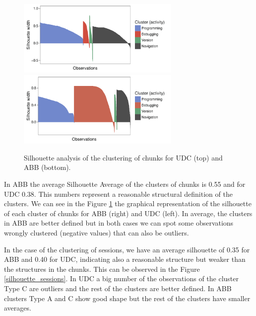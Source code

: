 \begin{figure}[!ht]
	
	\centering		
	\includegraphics[width=0.7\textwidth]{Figures/UDC_silhouette_chunks}
	\includegraphics[width=0.7\textwidth]{Figures/ABB_silhouette_chunks}	
	\caption{Silhouette analysis of the clustering of chunks for UDC (top) and ABB (bottom).}
	\label{silhouette_chunks}
\end{figure}

In ABB the average Silhouette Average of the clusters of chunks is 0.55 and for UDC 0.38. This numbers represent a reasonable structural definition of the clusters. We can see in the Figure \ref{silhouette_chunks} the graphical representation of the silhouette of each cluster of chunks for ABB (right) and UDC (left). In average, the clusters in ABB are better defined but in both cases we can spot some observations wrongly clustered (negative values) that can also be outliers.

In the case of the clustering of sessions, we have an average silhouette of 0.35 for ABB and 0.40 for UDC, indicating also a reasonable structure but weaker than the structures in the chunks. This can be observed in the Figure \ref{silhouette_sessions}. In UDC a big number of the observations of the cluster Type C are outliers and the rest of the clusters are better defined. In ABB clusters Type A and C show good shape but the rest of the clusters have smaller averages.


